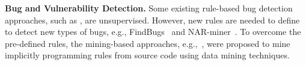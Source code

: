 


\textbf{Bug and Vulnerability Detection.}
Some existing rule-based bug detection approaches,
such as
\cite{Bian-2018,Jin-2012,Olivo-2015,Engler-2001,Cole-2006,Toman-2017},
are unsupervised. However, new rules are needed to
define to detect new types of bugs, e.g., FindBugs~\cite{Hovemeyer-2007} and NAR-miner~\cite{Bian-2018}.
%
To overcome the pre-defined rules, the mining-based approaches, e.g.,~\cite{Bian-2018,Jin-2012,Olivo-2015,Engler-2001,Cole-2006,Toman-2017,Li-2005}, were proposed to mine implicitly programming rules from source code using data mining techniques. 
